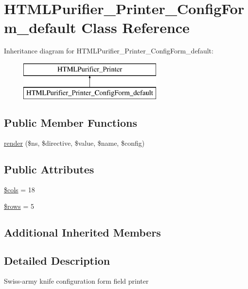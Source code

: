 \hypertarget{classHTMLPurifier__Printer__ConfigForm__default}{\section{H\+T\+M\+L\+Purifier\+\_\+\+Printer\+\_\+\+Config\+Form\+\_\+default Class Reference}
\label{classHTMLPurifier__Printer__ConfigForm__default}
}
Inheritance diagram for H\+T\+M\+L\+Purifier\+\_\+\+Printer\+\_\+\+Config\+Form\+\_\+default\+:\begin{figure}[H]
\begin{center}
\leavevmode
\includegraphics[height=2.000000cm]{classHTMLPurifier__Printer__ConfigForm__default}
\end{center}
\end{figure}
\subsection*{Public Member Functions}
\begin{DoxyCompactItemize}
\item 
\hyperlink{classHTMLPurifier__Printer__ConfigForm__default_a81e7b11a4d43c24a04e42514411e4262}{render} (\$ns, \$directive, \$value, \$name, \$config)
\end{DoxyCompactItemize}
\subsection*{Public Attributes}
\begin{DoxyCompactItemize}
\item 
\hyperlink{classHTMLPurifier__Printer__ConfigForm__default_a1b7a97e39411c8304643ab669a76f927}{\$cols} = 18
\item 
\hyperlink{classHTMLPurifier__Printer__ConfigForm__default_ae249df38b0d9e27b2d7a0f67b91e1ba6}{\$rows} = 5
\end{DoxyCompactItemize}
\subsection*{Additional Inherited Members}


\subsection{Detailed Description}
Swiss-\/army knife configuration form field printer 

